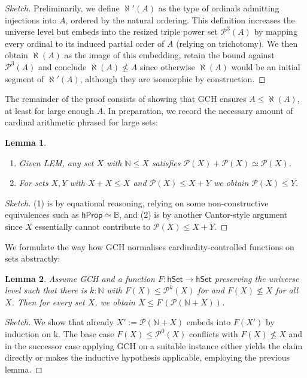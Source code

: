 \documentclass{easychair}
\newcommand{\nat}{\mathbb{N}}
\newcommand{\bool}{\mathbb{B}}
\newcommand{\pow}{\mathcal{P}}
\newcommand{\hprop}{\mathsf{hProp}}
\newcommand{\hset}{\mathsf{hSet}}
\newtheorem{lemma}{Lemma}
\begin{document}
\begin{proof}[Sketch]
	Preliminarily, we define $\aleph'(A)$ as the type of ordinals admitting injections into $A$, ordered by the natural ordering.
	This definition increases the universe level but embeds into the resized triple power set $\pow^3(A)$ by mapping every ordinal to its induced partial order of $A$ (relying on trichotomy).
	We then obtain $\aleph(A)$ as the image of this embedding, retain the bound against $\pow^3(A)$ and conclude $\aleph(A)\not\le A$ since otherwise $\aleph(A)$ would be an initial segment of $\aleph'(A)$, although they are isomorphic by construction.
\end{proof}

The remainder of the proof consists of showing that GCH ensures $A\le\aleph(A)$, at least for large enough $A$.
In preparation, we record the necessary amount of cardinal arithmetic phrased for large sets:

\begin{lemma}
	\begin{enumerate}[noitemsep]
		\item
		Given LEM, any set $X$ with $\nat\le X$ satisfies $\pow(X)+\pow(X)\simeq \pow(X)$.
		\item
		For sets $X,Y$ with $X+X\le X$ and $\pow (X)\le X+Y$ we obtain $\pow (X)\le Y$.
	\end{enumerate}
\end{lemma}
\begin{proof}[Sketch]
	(1) is by equational reasoning, relying on some non-constructive equivalences such as $\hprop\simeq\bool$, and (2) is by another Cantor-style argument since $X$ essentially cannot contribute to $\pow (X)\le X+Y$.
\end{proof}

We formulate the way how GCH normalises cardinality-controlled functions on sets abstractly:

\begin{lemma}
	Assume GCH and a function $F:\hset\to\hset$ preserving the universe level such that there is $k:\nat$ with $F(X)\le \pow^k(X)$ for and $F(X)\not\le X$ for all $X$.
	Then for every set $X$, we obtain $X\le F\,(\pow(\nat + X))$.
\end{lemma}

\begin{proof}[Sketch]
	We show that already $X':=\pow(\nat + X)$ embeds into $F(X')$ by induction on k.
	The base case $F(X)\le \pow^0(X)$ conflicts with $F(X)\not\le X$ and in the successor case applying GCH on a suitable instance either yields the claim directly or makes the inductive hypothesis applicable, employing the previous lemma.
\end{proof}
\end{document}
